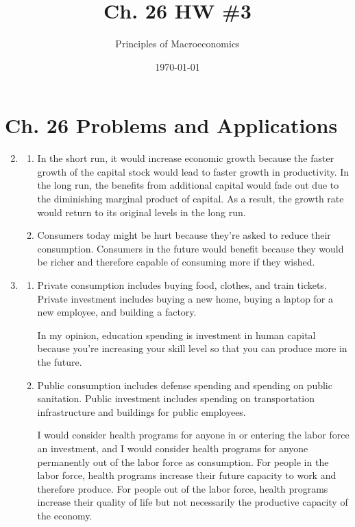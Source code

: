 \documentclass{article}
\title{Ch. 26 HW \#3}
\author{Principles of Macroeconomics}
\date{\today}
\begin{document}
\maketitle

\section*{Ch. 26 Problems and Applications}

\begin{enumerate}

\setcounter{enumi}{1}

\item

	\begin{enumerate}
	
	\item In the short run, it would increase economic growth because the faster growth of the capital stock would lead to faster growth in productivity. In the long run, the benefits from additional capital would fade out due to the diminishing marginal product of capital. As a result, the growth rate would return to its original levels in the long run.
	
	\item Consumers today might be hurt because they're asked to reduce their consumption. Consumers in the future would benefit because they would be richer and therefore capable of consuming more if they wished.
	
	\end{enumerate}

\item

	\begin{enumerate}
	
	\item Private consumption includes buying food, clothes, and train tickets. Private investment includes buying a new home, buying a laptop for a new employee, and building a factory.
	
	In my opinion, education spending is investment in human capital because you're increasing your skill level so that you can produce more in the future.
	
	\item Public consumption includes defense spending and spending on public sanitation. Public investment includes spending on transportation infrastructure and buildings for public employees. 
	
	I would consider health programs for anyone in or entering the labor force an investment, and I would consider health programs for anyone permanently out of the labor force as consumption. For people in the labor force, health programs increase their future capacity to work and therefore produce. For people out of the labor force, health programs increase their quality of life but not necessarily the productive capacity of the economy. 
	

\end{enumerate}
\end{enumerate}
\end{document}

